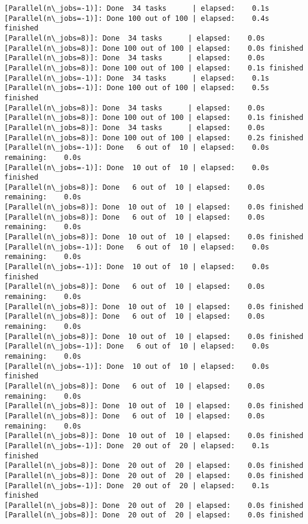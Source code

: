 \documentclass[11pt]{article}
\begin{document}
\begin{Verbatim}[commandchars=\\\{\}]
[Parallel(n\_jobs=-1)]: Done  34 tasks      | elapsed:    0.1s
[Parallel(n\_jobs=-1)]: Done 100 out of 100 | elapsed:    0.4s finished
[Parallel(n\_jobs=8)]: Done  34 tasks      | elapsed:    0.0s
[Parallel(n\_jobs=8)]: Done 100 out of 100 | elapsed:    0.0s finished
[Parallel(n\_jobs=8)]: Done  34 tasks      | elapsed:    0.0s
[Parallel(n\_jobs=8)]: Done 100 out of 100 | elapsed:    0.1s finished
[Parallel(n\_jobs=-1)]: Done  34 tasks      | elapsed:    0.1s
[Parallel(n\_jobs=-1)]: Done 100 out of 100 | elapsed:    0.5s finished
[Parallel(n\_jobs=8)]: Done  34 tasks      | elapsed:    0.0s
[Parallel(n\_jobs=8)]: Done 100 out of 100 | elapsed:    0.1s finished
[Parallel(n\_jobs=8)]: Done  34 tasks      | elapsed:    0.0s
[Parallel(n\_jobs=8)]: Done 100 out of 100 | elapsed:    0.2s finished
[Parallel(n\_jobs=-1)]: Done   6 out of  10 | elapsed:    0.0s remaining:    0.0s
[Parallel(n\_jobs=-1)]: Done  10 out of  10 | elapsed:    0.0s finished
[Parallel(n\_jobs=8)]: Done   6 out of  10 | elapsed:    0.0s remaining:    0.0s
[Parallel(n\_jobs=8)]: Done  10 out of  10 | elapsed:    0.0s finished
[Parallel(n\_jobs=8)]: Done   6 out of  10 | elapsed:    0.0s remaining:    0.0s
[Parallel(n\_jobs=8)]: Done  10 out of  10 | elapsed:    0.0s finished
[Parallel(n\_jobs=-1)]: Done   6 out of  10 | elapsed:    0.0s remaining:    0.0s
[Parallel(n\_jobs=-1)]: Done  10 out of  10 | elapsed:    0.0s finished
[Parallel(n\_jobs=8)]: Done   6 out of  10 | elapsed:    0.0s remaining:    0.0s
[Parallel(n\_jobs=8)]: Done  10 out of  10 | elapsed:    0.0s finished
[Parallel(n\_jobs=8)]: Done   6 out of  10 | elapsed:    0.0s remaining:    0.0s
[Parallel(n\_jobs=8)]: Done  10 out of  10 | elapsed:    0.0s finished
[Parallel(n\_jobs=-1)]: Done   6 out of  10 | elapsed:    0.0s remaining:    0.0s
[Parallel(n\_jobs=-1)]: Done  10 out of  10 | elapsed:    0.0s finished
[Parallel(n\_jobs=8)]: Done   6 out of  10 | elapsed:    0.0s remaining:    0.0s
[Parallel(n\_jobs=8)]: Done  10 out of  10 | elapsed:    0.0s finished
[Parallel(n\_jobs=8)]: Done   6 out of  10 | elapsed:    0.0s remaining:    0.0s
[Parallel(n\_jobs=8)]: Done  10 out of  10 | elapsed:    0.0s finished
[Parallel(n\_jobs=-1)]: Done  20 out of  20 | elapsed:    0.1s finished
[Parallel(n\_jobs=8)]: Done  20 out of  20 | elapsed:    0.0s finished
[Parallel(n\_jobs=8)]: Done  20 out of  20 | elapsed:    0.0s finished
[Parallel(n\_jobs=-1)]: Done  20 out of  20 | elapsed:    0.1s finished
[Parallel(n\_jobs=8)]: Done  20 out of  20 | elapsed:    0.0s finished
[Parallel(n\_jobs=8)]: Done  20 out of  20 | elapsed:    0.0s finished

\end{Verbatim}
\end{document}
